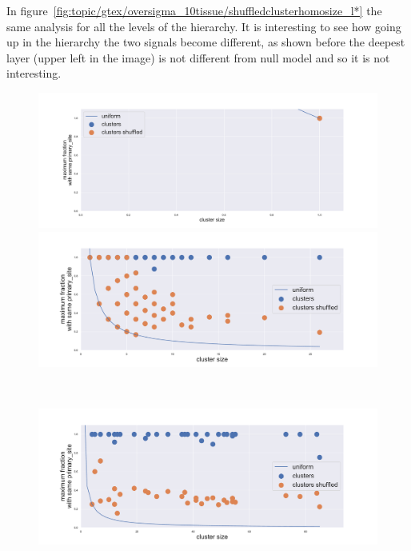 In figure~\ref{fig:topic/gtex/oversigma_10tissue/shuffledclusterhomosize_l*} the same analysis for all the levels of the hierarchy. It is interesting to see how going up in the hierarchy the two signals become different, as shown before the deepest layer (upper left in the image) is not different from null model and so it is not interesting.
\begin{figure}[htb!]
	\centering
	\begin{minipage}{0.45\textwidth}
		\includegraphics[width=0.9\linewidth]{pictures/topic/gtex/oversigma_10tissue/shuffledclusterhomosize_l0_primary_site.pdf}
	\end{minipage}
	\hspace{3mm}
	\begin{minipage}{0.45\textwidth}
		\includegraphics[width=0.9\linewidth]{pictures/topic/gtex/oversigma_10tissue/shuffledclusterhomosize_l1_primary_site.pdf}
	\end{minipage}
	\\
	\begin{minipage}{0.45\textwidth}
		\includegraphics[width=0.9\linewidth]{pictures/topic/gtex/oversigma_10tissue/shuffledclusterhomosize_l2_primary_site.pdf}

\end{minipage}
\end{figure}
